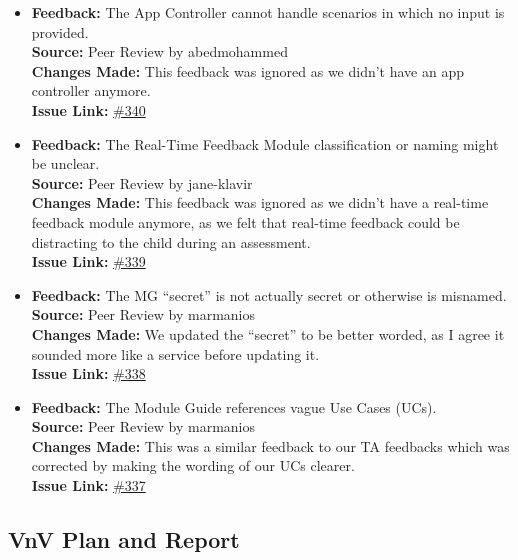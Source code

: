 \documentclass{article}
\begin{document}
\begin{itemize}
    \item 
        \textbf{Feedback:} The App Controller cannot handle scenarios in which no input is provided.\\
        \textbf{Source:} Peer Review by abedmohammed\\
        \textbf{Changes Made:} This feedback was ignored as we didn’t have an app controller anymore.\\
        \textbf{Issue Link:} \href{https://github.com/parishanizam/TeleHealth/issues/340}{\#340}
  
    \item 
        \textbf{Feedback:} The Real-Time Feedback Module classification or naming might be unclear.\\
        \textbf{Source:} Peer Review by jane-klavir\\
        \textbf{Changes Made:} This feedback was ignored as we didn’t have a real-time feedback module anymore, as we felt that real-time feedback could be distracting to the child during an assessment.\\
        \textbf{Issue Link:} \href{https://github.com/parishanizam/TeleHealth/issues/339}{\#339}
  
    \item 
        \textbf{Feedback:} The MG “secret” is not actually secret or otherwise is misnamed.\\
        \textbf{Source:} Peer Review by marmanios\\
        \textbf{Changes Made:} We updated the “secret” to be better worded, as I agree it sounded more like a service before updating it.\\
        \textbf{Issue Link:} \href{https://github.com/parishanizam/TeleHealth/issues/338}{\#338}
  
    \item 
        \textbf{Feedback:} The Module Guide references vague Use Cases (UCs).\\
        \textbf{Source:} Peer Review by marmanios\\
        \textbf{Changes Made:} This was a similar feedback to our TA feedbacks which was corrected by making the wording of our UCs clearer.\\
        \textbf{Issue Link:} \href{https://github.com/parishanizam/TeleHealth/issues/337}{\#337}

\end{itemize}

\newpage

\subsection{VnV Plan and Report}
\end{document}
